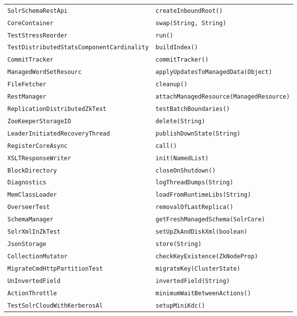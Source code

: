 \begin{center}
\begin{longtable}{ll}
\lstinline/SolrSchemaRestApi/&{\lstinline/createInboundRoot()/}\\
\lstinline/CoreContainer/&{\lstinline/swap(String, String)/}\\
\lstinline/TestStressReorder/&{\lstinline/run()/}\\
\lstinline/TestDistributedStatsComponentCardinality/&{\lstinline/buildIndex()/}\\
\lstinline/CommitTracker/&{\lstinline/commitTracker()/}\\
\lstinline/ManagedWordSetResourc/&{\lstinline/applyUpdatesToManagedData(Object)/}\\
\lstinline/FileFetcher/&{\lstinline/cleanup()/}\\
\lstinline/RestManager/&{\lstinline/attachManagedResource(ManagedResource)/}\\
\lstinline/ReplicationDistributedZkTest/&{\lstinline/testBatchBoundaries()/}\\
\lstinline/ZooKeeperStorageIO/&{\lstinline/delete(String)/}\\
\lstinline/LeaderInitiatedRecoveryThread/&{\lstinline/publishDownState(String)/}\\
\lstinline/RegisterCoreAsync/&{\lstinline/call()/}\\
\lstinline/XSLTResponseWriter/&{\lstinline/init(NamedList)/}\\
\lstinline/BlockDirectory/&{\lstinline/closeOnShutdown()/}\\
\lstinline/Diagnostics/&{\lstinline/logThreadDumps(String)/}\\
\lstinline/MemClassLoader/&{\lstinline/loadFromRuntimeLibs(String)/}\\
\lstinline/OverseerTest/&{\lstinline/removalOfLastReplica()/}\\
\lstinline/SchemaManager/&{\lstinline/getFreshManagedSchema(SolrCore)/}\\
\lstinline/SolrXmlInZkTest/&{\lstinline/setUpZkAndDiskXml(boolean)/}\\
\lstinline/JsonStorage/&{\lstinline/store(String)/}\\
\lstinline/CollectionMutator/&{\lstinline/checkKeyExistence(ZkNodeProp)/}\\
\lstinline/MigrateCmdHttpPartitionTest/&{\lstinline/migrateKey(ClusterState)/}\\
\lstinline/UnInvertedField/&{\lstinline/invertedField(String)/}\\
\lstinline/ActionThrottle/&{\lstinline/minimumWaitBetweenActions()/}\\
\lstinline/TestSolrCloudWithKerberosAl/&{\lstinline/setupMiniKdc()/}\\

\end{longtable}
\end{center}
